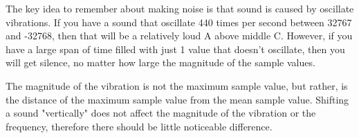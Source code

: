 \begin{exercises}
\begin{ex}
The key idea to remember about making noise is that sound is caused by
oscillate vibrations. If you have a sound that oscillate 440 times per
second between 32767 and -32768, then that will be a relatively loud A
above middle C. However, if you have a large span of time filled with just
1 value that doesn't oscillate, then you will get silence, no matter how
large the magnitude of the sample values.
\end{ex}

\begin{ex}
The magnitude of the vibration is not the maximum sample value, but rather,
is the distance of the maximum sample value from the mean sample value.
Shifting a sound "vertically" does not affect the magnitude of the
vibration or the frequency, therefore there should be little noticeable
difference.
\end{ex}

\end{exercises}
